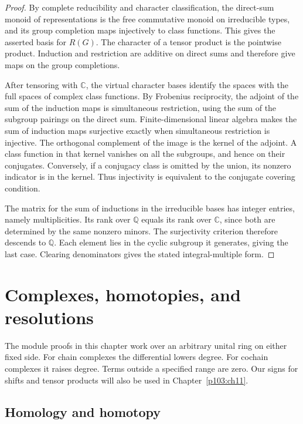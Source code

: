 \documentclass[11pt,oneside,openany]{book}
\theoremstyle{definition}
\theoremstyle{remark}
\begin{document}
\begin{proof}
By complete reducibility and character classification, the
direct-sum monoid of representations is the free commutative
monoid on irreducible types, and its group completion maps
injectively to class functions. This gives the asserted basis
for \(R(G)\). The character of a tensor product is the
pointwise product. Induction and restriction are additive on
direct sums and therefore give maps on the group completions.

After tensoring with \(\mathbb C\), the virtual character bases
identify the spaces with the full spaces of complex class
functions. By Frobenius reciprocity, the adjoint of the sum of
the induction maps is simultaneous restriction, using the sum
of the subgroup pairings on the direct sum. Finite-dimensional
linear algebra makes the sum of induction maps surjective
exactly when simultaneous restriction is injective. The
orthogonal complement of the image is the kernel of the adjoint.
A class function in that kernel vanishes on all the subgroups,
and hence on their conjugates. Conversely, if a conjugacy class
is omitted by the union, its nonzero indicator is in the kernel.
Thus injectivity is equivalent to the conjugate covering condition.

The matrix for the sum of inductions in the irreducible bases
has integer entries, namely multiplicities. Its rank over
\(\mathbb Q\) equals its rank over \(\mathbb C\), since both
are determined by the same nonzero minors. The surjectivity
criterion therefore descends to \(\mathbb Q\). Each element
lies in the cyclic subgroup it generates, giving the last case.
Clearing denominators gives the stated integral-multiple form.
\end{proof}
\chapter{Complexes, homotopies, and resolutions}
\label{p103:ch10}

The module proofs in this chapter work over an arbitrary unital ring
on either fixed side. For chain complexes the differential lowers
degree. For cochain complexes it raises degree. Terms outside a
specified range are zero. Our signs for shifts and tensor products
will also be used in Chapter~\ref{p103:ch11}.

\section{Homology and homotopy}
\end{document}
